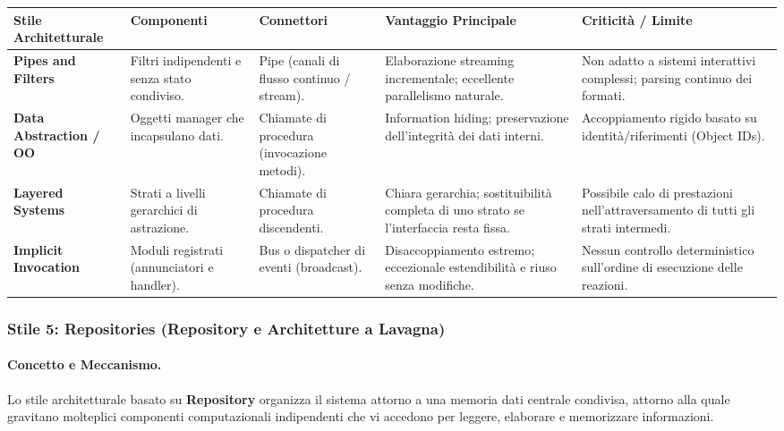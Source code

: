 \documentclass[12pt]{extarticle}
\begin{document}
\begin{center}
\small
\begin{tabular}{p{2.6cm}p{2.6cm}p{2.4cm}p{3.2cm}p{3.2cm}}
    \toprule
    \textbf{Stile Architetturale} & \textbf{Componenti} & \textbf{Connettori} & \textbf{Vantaggio Principale} & \textbf{Criticità / Limite} \\
    \midrule
    \textbf{Pipes and Filters} & Filtri indipendenti e senza stato condiviso. & Pipe (canali di flusso continuo / stream). & Elaborazione streaming incrementale; eccellente parallelismo naturale. & Non adatto a sistemi interattivi complessi; parsing continuo dei formati. \\
    \addlinespace
    \textbf{Data Abstraction / OO} & Oggetti manager che incapsulano dati. & Chiamate di procedura (invocazione metodi). & Information hiding; preservazione dell'integrità dei dati interni. & Accoppiamento rigido basato su identità/riferimenti (Object IDs). \\
    \addlinespace
    \textbf{Layered Systems} & Strati a livelli gerarchici di astrazione. & Chiamate di procedura discendenti. & Chiara gerarchia; sostituibilità completa di uno strato se l'interfaccia resta fissa. & Possibile calo di prestazioni nell'attraversamento di tutti gli strati intermedi. \\
    \addlinespace
    \textbf{Implicit Invocation} & Moduli registrati (annunciatori e handler). & Bus o dispatcher di eventi (broadcast). & Disaccoppiamento estremo; eccezionale estendibilità e riuso senza modifiche. & Nessun controllo deterministico sull'ordine di esecuzione delle reazioni. \\
    \bottomrule
\end{tabular}
\end{center}



\subsubsection{Stile 5: Repositories (Repository e Architetture a Lavagna)}

\paragraph{Concetto e Meccanismo.}
Lo stile architetturale basato su \textbf{Repository} organizza il sistema attorno a una memoria dati centrale condivisa, attorno alla quale gravitano molteplici componenti computazionali indipendenti che vi accedono per leggere, elaborare e memorizzare informazioni.
\end{document}

